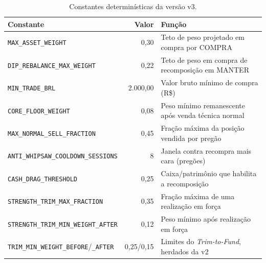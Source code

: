 \begin{table}[htbp]
\centering
\caption{Constantes determinísticas da versão v3.}
\label{tab:constantes-v3}
\small
\begin{tabular}{l r p{6.4cm}}
\toprule
\textbf{Constante} & \textbf{Valor} & \textbf{Função} \\
\midrule
\texttt{MAX\_ASSET\_WEIGHT} & 0,30 & Teto de peso projetado em compra por COMPRA \\
\texttt{DIP\_REBALANCE\_MAX\_WEIGHT} & 0,22 & Teto de peso em compra de recomposição em MANTER \\
\texttt{MIN\_TRADE\_BRL} & 2.000,00 & Valor bruto mínimo de compra (R\$) \\
\texttt{CORE\_FLOOR\_WEIGHT} & 0,08 & Peso mínimo remanescente após venda técnica normal \\
\texttt{MAX\_NORMAL\_SELL\_FRACTION} & 0,45 & Fração máxima da posição vendida por pregão \\
\texttt{ANTI\_WHIPSAW\_COOLDOWN\_SESSIONS} & 8 & Janela contra recompra mais cara (pregões) \\
\texttt{CASH\_DRAG\_THRESHOLD} & 0,25 & Caixa/patrimônio que habilita a recomposição \\
\texttt{STRENGTH\_TRIM\_MAX\_FRACTION} & 0,35 & Fração máxima de uma realização em força \\
\texttt{STRENGTH\_TRIM\_MIN\_WEIGHT\_AFTER} & 0,12 & Peso mínimo após realização em força \\
\texttt{TRIM\_MIN\_WEIGHT\_BEFORE}/\texttt{\_AFTER} & 0,25/0,15 & Limites do \textit{Trim-to-Fund}, herdados da v2 \\
\bottomrule
\end{tabular}
\end{table}

